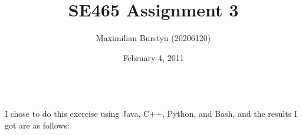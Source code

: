 \documentclass[12pt]{article}
\title{SE465 Assignment 3}
\author{Maximilian Burstyn (20206120)}
\date{February 4, 2011}
\begin{document}
\maketitle
{}
\begin{list}{\bf{Question .}}{}

\item \hfill\\
I chose to do this exercise using Java, C++, Python, and Bash, and the results I got are as follows:\\


\end{list}
\end{document}
